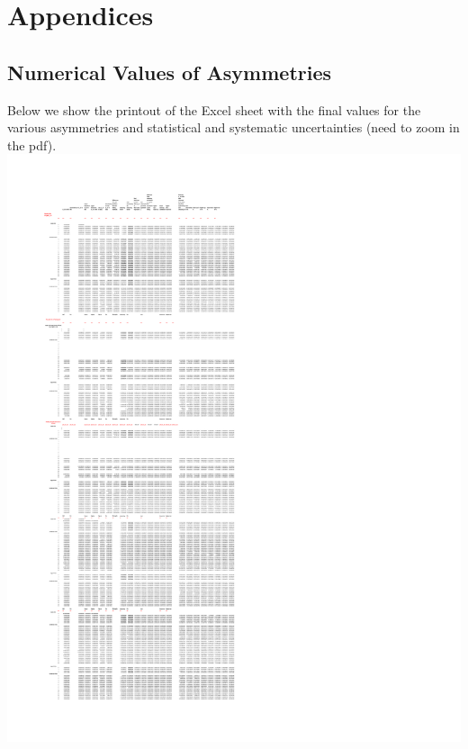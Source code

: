 \documentclass[english,notitlepage,12pt,a4paper]{article}
\begin{document}
\newpage
\tableofcontents

\newpage
  \listoffigures
     \listoftables
     
\newpage















\appendix
\label{sec:appendix}
\section*{Appendices}
\renewcommand{\thesubsection}{\Alph{subsection}}



\subsection{Numerical Values of Asymmetries}\label{sec:spreadsheet}
Below we show the printout of the Excel sheet with the final values for the various asymmetries and statistical and systematic uncertainties (need to zoom in the pdf).
\includegraphics[width=1.06\textwidth]{FinalResult_2017_BugfixedJuly3_2017_Relabelled2_Page.pdf}




%



%


\end{document}
